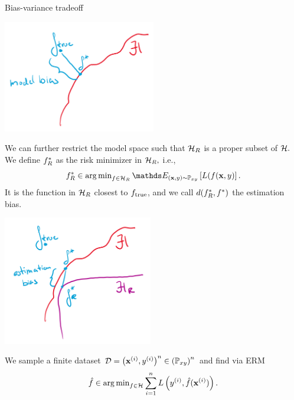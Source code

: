 \documentclass[11pt,compress,t,notes=noshow, xcolor=table]{beamer}
\begin{document}
\begin{vbframe}{Bias-variance tradeoff}
\begin{center}
\includegraphics[width=0.5\textwidth]{figure_man/to_replace_model_bias.png}
\end{center}
\framebreak 
We can further restrict the model space such that $\mathcal{H}_R$ is a proper subset of $\mathcal{H}.$
We define $f^{\ast}_R$ as the risk minimizer in $\mathcal{H}_R,$ i.e.,
$$\fbayes_R \in \argmin_{f \in \Hspace_R} \E_{\xy \sim \Pxy}\left[L(f(\xv, y)\right].$$
It is the function in $\mathcal{H}_R$ closest to $f_{\text{true}}$, and we call $d(f^{\ast}_R, f^{\ast})$ the estimation bias.
\begin{center}
\includegraphics[width=0.49\textwidth]{figure_man/to_replace_estimation_bias.png}
\end{center}
\framebreak

We sample a finite dataset $\mathcal{D} = \left(\mathbf{x}^{(i)}, y^{(i)}\right)^n \in \left(\mathbb{P}_{xy}\right)^n$ and find via ERM
$$\hat{f} \in \operatorname{arg\,min}_{f\in\mathcal{H}} \sum\limits_{i=1}^n L\left(y^{(i)}, \hat{f} (\mathbf{x}^{(i)})\right).$$

\begin{columns}[onlytextwidth,T]


\end{columns}
\end{vbframe}
\end{document}
